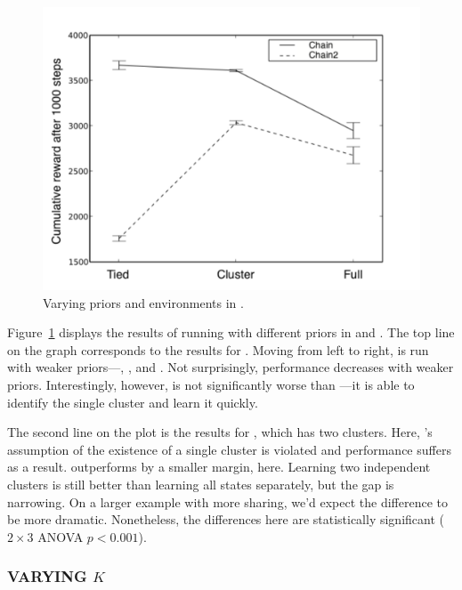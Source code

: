 \begin{figure}[t]
\begin{center}
\includegraphics[width=1.0\linewidth]{2x3}
\caption{Varying priors and environments in .}
\label{f:twobythree}
\end{center}
\end{figure}

Figure~\ref{f:twobythree} displays the results of running  with
different priors in  and .  The top line on the graph
corresponds to the results for .  Moving from left to right, 
is run with weaker priors---, , and .  Not
surprisingly, performance decreases with weaker priors.
Interestingly, however,  is not significantly worse than
---it is able to identify the single cluster and learn it quickly.

The second line on the plot is the results for , which has two
clusters.  Here, 's assumption of the existence of a single
cluster is violated and performance suffers as a result.  
outperforms  by a smaller margin, here.  Learning two independent
clusters is still better than learning all states separately, but the
gap is narrowing.  On a larger example with more sharing, we'd expect
the difference to be more dramatic.  Nonetheless, the differences here
are statistically significant ($2\times 3$ ANOVA $p<0.001$).


\subsubsection{VARYING $K$}

